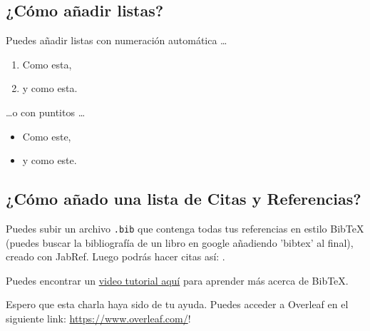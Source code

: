 \documentclass[a4paper]{article}
\begin{document}
\subsection{¿Cómo añadir listas?}

Puedes añadir listas con numeración automática \dots

\begin{enumerate}
\item Como esta,
\item y como esta.
\end{enumerate}
\dots o con puntitos \dots
\begin{itemize}
\item Como este,
\item y como este.
\end{itemize}

\subsection{¿Cómo añado una lista de Citas y Referencias?}

Puedes subir un archivo \verb|.bib| que contenga todas tus referencias en estilo BibTeX (puedes buscar la bibliografía de un libro en google añadiendo 'bibtex' al final), creado con JabRef. Luego podrás hacer citas así: \cite{Griffiths:1492149}.

Puedes encontrar un \href{https://www.overleaf.com/help/97-how-to-include-a-bibliography-using-bibtex}{video tutorial aquí} para aprender más acerca de BibTeX.

Espero que esta charla haya sido de tu ayuda. Puedes acceder a Overleaf en el siguiente link: \url{https://www.overleaf.com/}!



\end{document}
